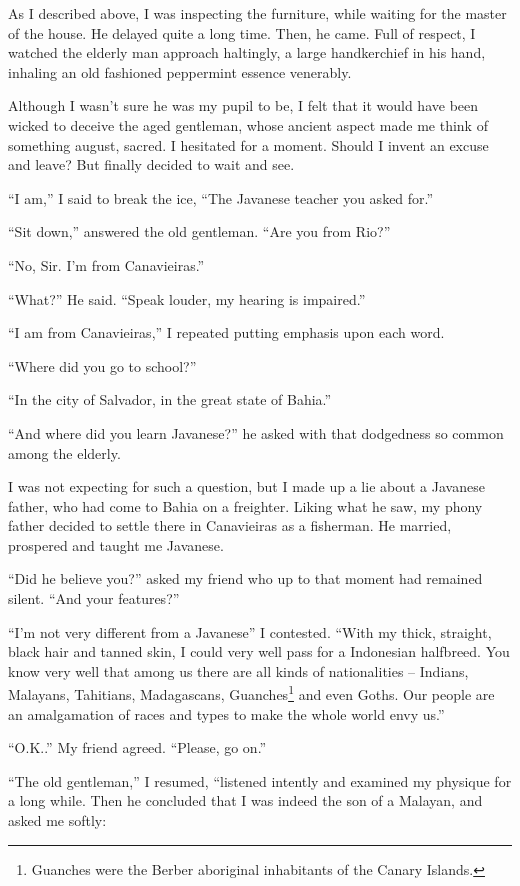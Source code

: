 \documentclass[a4paper,12pt]{book}
\begin{document}
As I described above, I was inspecting the furniture,
while waiting for the master of the house.
He delayed quite a long time. Then, he came.
Full of respect, I watched the elderly man
approach haltingly,
a large handkerchief in his
hand, inhaling an old fashioned peppermint
essence venerably.

Although I wasn't sure he was my pupil to be, I felt
that it would have been wicked to deceive the
aged gentleman, whose ancient aspect made
me think of something august, sacred.
I hesitated for a moment. Should I invent
an excuse and leave? But finally
decided to wait and see.

``I am,'' I said to break the ice,
``The Javanese teacher you asked for.''

``Sit down,'' answered the old gentleman.
``Are you from Rio?''

``No, Sir. I'm from Canavieiras.''

``What?'' He said. ``Speak louder, my hearing is impaired.''

``I am from Canavieiras,'' I repeated putting emphasis
upon each word.

``Where did you go to school?''

``In the city of Salvador, in the great state of Bahia.''

``And where did you learn Javanese?'' he
asked with that dodgedness so common among the elderly.

I was not expecting for such a question,
but I made up a lie about a
Javanese father, who had come to Bahia
on a freighter. Liking what he saw,
my phony father decided to
settle there in Canavieiras as a fisherman.
He married, prospered and taught me Javanese.

``Did he believe you?'' asked my friend
who up to that moment had remained silent.
``And your features?''

``I'm not very different from a Javanese''
I contested. ``With my thick, straight, black hair
and tanned skin, I could very well pass for
a Indonesian halfbreed. You know very well
that among us there are all kinds of nationalities
-- Indians, Malayans, Tahitians, Madagascans,
Guanches\footnote{Guanches were the Berber aboriginal
  inhabitants of the Canary Islands.}
and even Goths. Our people are an amalgamation
of races and types to make the whole world envy us.''

``O.K..'' My friend agreed. ``Please, go on.''

``The old gentleman,''  I resumed,
``listened intently and examined my physique
for a long while. Then he concluded that I was
indeed the son of a Malayan, and asked me softly:
\end{document}
